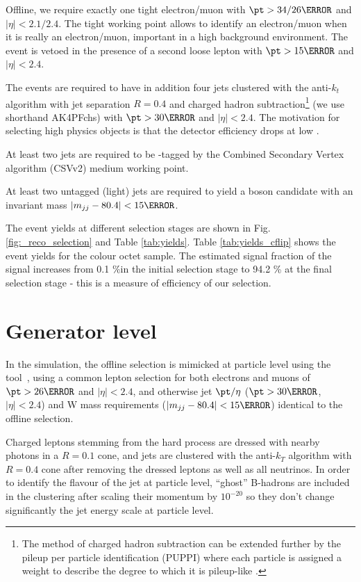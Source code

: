 Offline, we require exactly one tight electron/muon with $\pt > 34/26\GeV$ and $|\eta| < 2.1/2.4$. The tight working point allows to identify an electron/muon when it is really an electron/muon, important in a high background environment.
The event is vetoed in the presence of a second loose lepton with $\pt > 15\GeV$ and $|\eta| < 2.4$.

The events are required to have in addition four jets clustered with the anti-$k_{t}$ algorithm with jet separation $R=0.4$ and charged hadron subtraction\footnote{The method of charged hadron subtraction can be extended further by the pileup per particle identification (PUPPI) where each particle is assigned a weight to describe the degree to which it is pileup-like \cite{Bertolini:2014bba}.} (we use shorthand AK4PFchs) with $\pt>30\GeV$  and $|\eta|<2.4$. The motivation for selecting high \pt physics objects is that the detector efficiency drops at low \pt.

At least two jets are required to be \cPqb-tagged by the Combined Secondary Vertex algorithm (CSVv2) medium working point. 

At least two untagged (light) jets are required to yield a \PW boson candidate with an invariant mass $\left|m_{jj}-80.4\right|<15\GeV$.

The event yields at different selection stages are shown in Fig. \ref{fig:_reco_selection} and Table \ref{tab:yields}.  Table \ref{tab:yields_cflip} shows the event yields for the colour octet \PW sample. The estimated signal fraction of the signal increases from 0.1 \%in the initial selection stage to 94.2 \% at the final selection stage - this is a measure of efficiency of our selection.









\section{Generator level}
\label{sec:generator_level}

In the simulation, the offline selection is mimicked at particle level using the \PSEUDOTOPPRODUCER tool~\cite{code:pseudotop}, using a common lepton selection for both electrons and muons of $\pt>26\GeV$ and $|\eta| < 2.4$, and otherwise jet $\pt/\eta$ ($\pt>30\GeV$, $|\eta| < 2.4$) and W mass requirements ($\left|m_{jj}-80.4\right|<15\GeV$) identical to the offline selection.

Charged leptons stemming from the hard process are dressed with nearby photons in a $R=0.1$ cone, and jets are clustered with the anti-$k_T$ algorithm with  $R=0.4$ cone after removing the dressed leptons as well as all neutrinos. In order to identify the flavour of the jet at particle level, ``ghost'' B-hadrons are included in the clustering after scaling their momentum by $10^{-20}$ so they don't change significantly the jet energy scale at particle level.
